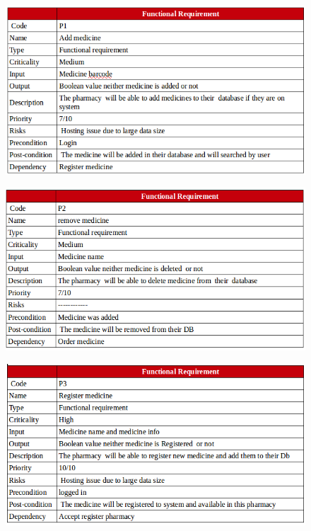 \documentclass[]{article}
\begin{document}
\begin{figure}[H]
\centering
\includegraphics[scale=0.4]{./f/21}
\end{figure}

\begin{figure}[H]
\centering
\includegraphics[scale=0.4]{./f/22}
\end{figure}

\begin{figure}[H]
\centering
\includegraphics[scale=0.4]{./f/23}
\end{figure}
\end{document}
